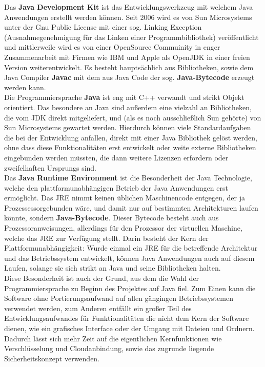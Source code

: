 \documentclass[12pt,a4paper,bibliography=totocnumbered,listof=totocnumbered]{scrartcl}
\begin{document}
Das \textbf{Java Development Kit} ist das Entwicklungswerkzeug mit welchem Java Anwendungen erstellt werden können. Seit 2006 wird es von Sun Microsystems unter der Gnu Public License mit einer sog. Linking Exception (Ausnahmegenehmigung für das Linken einer Programmbibliothek) veröffentlicht und mittlerweile wird es von einer OpenSource Commuinity in enger Zusammenarbeit mit Firmen wie IBM und Apple als OpenJDK in einer freien Version weiterentwickelt. Es besteht hauptsächlich aus Bibliotheken, sowie dem Java Compiler \textbf{Javac} mit dem aus Java Code der sog. \textbf{Java-Bytecode} erzeugt werden kann.\\
Die Programmiersprache \textbf{Java} ist eng mit C++ verwandt und strikt Objekt orientiert. Das besondere an Java sind außerdem eine vielzahl an Bibliotheken, die vom JDK direkt mitgeliefert, und (als es noch ausschließlich Sun gehörte) von Sun Microsystems gewartet werden. Hierdurch können viele Standardaufgaben die bei der Entwicklung anfallen, direkt mit einer Java Bibliothek gelöst werden, ohne dass diese Funktionalitäten erst entwickelt oder weite externe Bibliotheken eingebunden werden müssten, die dann weitere Lizenzen erfordern oder zweifelhaften Ursprungs sind.\\
Das \textbf{Java Runtime Environment} ist die Besonderheit der Java Technologie, welche den plattformunabhängigen Betrieb der Java Anwendungen erst ermöglicht. Das  JRE nimmt keinen üblichen Maschinencode entgegen, der ja Prozessessorgebunden wäre, und damit nur auf bestimmten Architekturen laufen könnte, sondern \textbf{Java-Bytecode}. Dieser Bytecode besteht auch aus Prozessoranweisungen, allerdings für den Prozessor der virtuellen Maschine, welche das JRE zur Verfügung stellt. Darin besteht der Kern der Plattformunabhängigkeit: Wurde einmal ein JRE für die betreffende Architektur und das Betriebssystem entwickelt, können Java Anwendungen auch auf diesem Laufen, solange sie sich strikt an Java und seine Bibliotheken halten.\\
Diese Besonderheit ist auch der Grund, aus dem die Wahl der Programmiersprache zu Beginn des Projektes auf Java fiel. Zum Einen kann die Software ohne Portierungsaufwand auf allen gängingen Betriebssystemen verwendet werden, zum Anderen entfällt ein großer Teil des Entwicklungsaufwandes für Funktionalitäten die nicht dem Kern der Software dienen, wie ein grafisches Interface oder der Umgang mit Dateien und Ordnern. Dadurch lässt sich mehr Zeit auf die eigentlichen Kernfunktionen wie Verschlüsselung und Cloudanbindung,  sowie das zugrunde liegende Sicherheitskonzept verwenden.\\
\cite{1}\cite{2}\cite{3}
\end{document}
